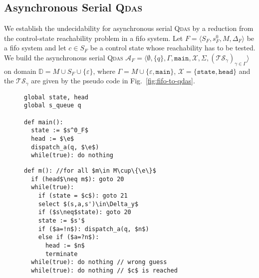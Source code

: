 \documentclass[runningheads,oribibl,]{article}
\newcommand{\tuple}[1]{\langle#1\rangle\xspace}
\newcommand{\Aa}{\ensuremath{\mathcal{A}}\xspace}
\newcommand{\Ts}{\ensuremath{\mathcal{TS}}\xspace}
\newcommand{\Xx}{\ensuremath{\mathcal{X}}\xspace}
\newcommand{\e}{\ensuremath{\varepsilon}\xspace}
\newcommand{\DD}{\ensuremath{\mathbb{D}}\xspace}
\newcommand{\qdas}{\textsc{Qdas}\xspace}
\newcommand{\fifo}{fifo\xspace}
\begin{document}
\subsection{Asynchronous Serial \qdas}
 We
establish the undecidability for asynchronous serial \qdas  by a reduction from the control-state  reachability
problem in a \fifo system. Let $F=\tuple{S_F,s_F^0,M,\Delta_F}$ be a
\fifo system and let $c\in S_F$ be a control state whose reachability
has to be tested. We build the asynchronous serial \qdas
$\Aa_F=\tuple{ \emptyset, \{q\}, \Gamma, \mathtt{main}, \Xx, \Sigma,
  (\Ts_\gamma)_{\gamma\in\Gamma}}$ on domain $\DD=M\cup
S_F\cup\{\e\}$, where $\Gamma=M\cup\{\e,\mathtt{main}\}$,
$\Xx=\{\mathtt{state},\mathtt{head}\}$ and the $\Ts_{\gamma}$ are
given by the pseudo code in Fig.~\ref{fig:fifo-to-qdas}.
\begin{figure}[t]
  \centering
    \begin{minipage}[t]{.45\linewidth}
      \begin{lstlisting}
global state, head
global s_queue q

def main():
  state := $s^0_F$
  head := $\e$
  dispatch_a(q, $\e$)
  while(true): do nothing
      \end{lstlisting}

      \begin{minipage}{0.8\textwidth}
    \end{minipage}

    \end{minipage}
    \begin{minipage}[t]{.5\linewidth}
      \begin{lstlisting}[firstnumber=last]
def m(): //for all $m\in M\cup\{\e\}$
  if (head$\neq m$): goto 20
  while(true):
    if (state = $c$): goto 21
    select $(s,a,s')\in\Delta_y$
    if ($s\neq$state): goto 20
    state := $s'$
    if ($a=!n$): dispatch_a(q, $n$)
    else if ($a=?n$):
      head := $n$
      terminate
  while(true): do nothing // wrong guess
  while(true): do nothing // $c$ is reached
      \end{lstlisting}
    \end{minipage}


\end{figure}
\end{document}

